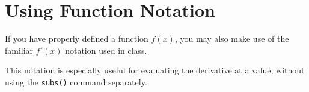 \begin{maplegroup}
\begin{mapleinput}
\end{mapleinput}
\mapleresult
\begin{maplelatex}
\end{maplelatex}
\end{maplegroup}

\section{Using Function Notation}

If you have properly defined a function $f(x)$, you may also make use of the familiar $f'(x)$ notation used in class.
\begin{maplegroup}
\begin{mapleinput}
\end{mapleinput}
\mapleresult
\begin{maplelatex}
\end{maplelatex}
\end{maplegroup}

\begin{maplegroup}
\begin{mapleinput}
\end{mapleinput}
\mapleresult
\begin{maplelatex}
\end{maplelatex}
\end{maplegroup}

\noindent
This notation is especially useful for evaluating the derivative at a value, without using the \texttt{subs()} command separately.

\begin{maplegroup}
\begin{mapleinput}
\end{mapleinput}
\mapleresult
\begin{maplelatex}
\end{maplelatex}
\end{maplegroup}

